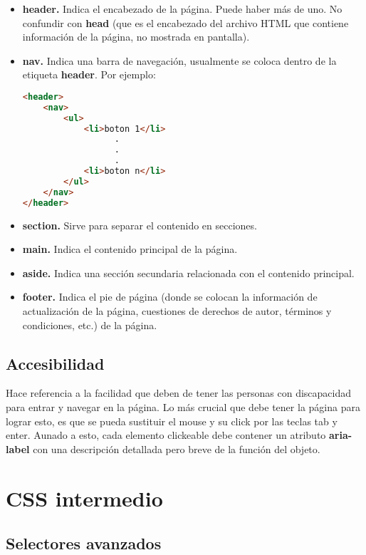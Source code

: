 \documentclass[10pt,oneside]{article}
\begin{document}
\begin{multicols}{2}
    \begin{itemize}
        \item \textbf{header.} Indica el encabezado de la página. Puede haber más de uno. No confundir con \textbf{head} (que es el encabezado del archivo HTML que contiene información de la página, no mostrada en pantalla). 
        \item \textbf{nav.} Indica una barra de navegación, usualmente se coloca dentro de la etiqueta \textbf{header}. Por ejemplo:

        \begin{lstlisting}[language=HTML]
<header>
    <nav>
        <ul>
            <li>boton 1</li>
                  .
                  .
                  .
            <li>boton n</li>
        </ul>
    </nav>
</header>
        \end{lstlisting}
        
        \item \textbf{section.} Sirve para separar el contenido en secciones.
        \item \textbf{main.} Indica el contenido principal de la página.
        \item  \textbf{aside.} Indica una sección secundaria relacionada con el contenido principal.
        \item \textbf{footer.} Indica el pie de página (donde se colocan la información de actualización de la página, cuestiones de derechos de autor, términos y condiciones, etc.) de la página.
    \end{itemize}

\subsection{Accesibilidad}

    Hace referencia a la facilidad que deben de tener las personas con discapacidad para entrar y navegar en la página. Lo más crucial que debe tener la página para lograr esto, es que se pueda sustituir el mouse y su click por las teclas tab y enter. Aunado a esto, cada elemento clickeable debe contener un atributo \textbf{aria-label} con una descripción detallada pero breve de la función del objeto.

\section{CSS intermedio}
\subsection{Selectores avanzados}


\end{multicols}
\end{document}
